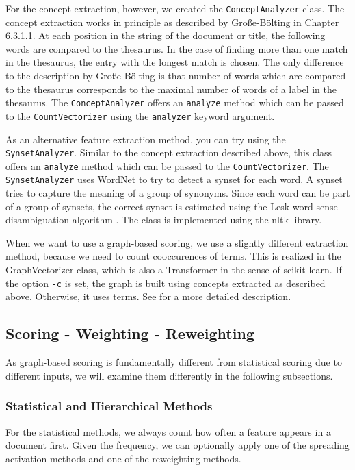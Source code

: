 \documentclass{article}
\begin{document}
For the concept extraction, however, we created the \texttt{ConceptAnalyzer} class.
The concept extraction works in principle as described by Große-Bölting \cite{boltingMaster2015} in Chapter 6.3.1.1.
At each position in the string of the document or title,
the following words are compared to the thesaurus.
In the case of finding more than one match in the thesaurus,
the entry with the longest match is chosen.
The only difference to the description by Große-Bölting is that number of words which are compared to
the thesaurus corresponds to the maximal number of words of a label in the thesaurus.
The \texttt{ConceptAnalyzer} offers an \texttt{analyze} method which can be passed to the
\texttt{CountVectorizer} using the \texttt{analyzer} keyword argument.

As an alternative feature extraction method, you can try using the \texttt{SynsetAnalyzer}.
Similar to the concept extraction described above, this class offers an \texttt{analyze}
method which can be passed to the \texttt{CountVectorizer}.
The \texttt{SynsetAnalyzer} uses WordNet \cite{wordnet} to try to detect a synset for each word.
A synset tries to capture the meaning of a group of synonyms.
Since each word can be part of a group of synsets,
the correct synset is estimated using the Lesk word sense disambiguation algorithm \cite{Lesk:1986:ASD:318723.318728}.
The class is implemented using the nltk library.

When we want to use a graph-based scoring, we use a slightly different extraction method, because we need to count cooccurences of terms.
This is realized in the
GraphVectorizer class, which is also a Transformer in the sense of scikit-learn.
If the option \texttt{-c} is set, the graph is built using concepts extracted as described above.
Otherwise, it uses terms.
See  for a more detailed description.

\subsection{Scoring - Weighting - Reweighting}
As graph-based scoring is fundamentally different from statistical scoring due to different inputs, we will examine them differently in the following subsections.
\subsubsection{Statistical and Hierarchical Methods}
For the statistical methods, we always count how often a feature appears in a document first. Given the frequency,
we can optionally apply one of the spreading activation methods and one of the reweighting methods.
\end{document}
